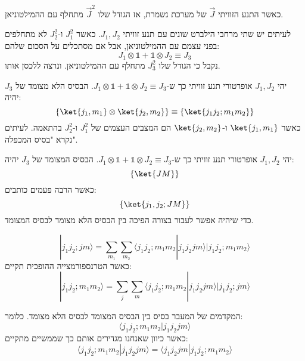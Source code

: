 \documentclass{tstextbook}
\begin{document}
\begin{reminder}
כאשר התנע הזוויתי \(\vec{J}\) של מערכת נשמרת, אז הגודל שלו \(\vec{J}^{2}\) מתחלף עם ההמילטוניאן.

\end{reminder}
\begin{proposition}
לעיתים יש שתי מרחבי הילברט שונים עם תנע זוויתי \(J_{1},J_{2}\). כאשר \(J_{1}^{2}\) ו-\(J_{2}^{2}\) לא מתחלפים בפני עצמם עם ההמילטוניאן, אבל אם מסתכלים על הסכום שלהם:
$$J_{1}\otimes \mathbb{1} +\mathbb{1} \otimes J_{2}\equiv J_{3}$$
נקבל כי הגודל שלו \(J_{3}^{2}\) מתחלף עם ההמילטוניאן. ונרצה ללכסן אותו.

\end{proposition}
\begin{definition}
יהי \(J_{1},J_{2}\) אופרטורי תנע זוויתי כך ש-\(J_{1}\otimes \mathbb{1} +\mathbb{1} \otimes J_{2}\equiv J_{3}\). הבסיס הלא מצומד של \(J_{3}\) יהיה:
$$\left\{  \ket{j_{1},m_{1}} \otimes \ket{j_{2},m_{2}}   \right\}\equiv \left\{  \ket{j_{1}j_{2};m_{1}m_{2}}   \right\}$$
כאשר \(\ket{j_{1},m_{1}}\) ו-\(\ket{j_{2},m_{2}}\) הם המצבים העצמים של \(J_{1}^{2}\) ו-\(J_{2}^{2}\) בהתאמה. לעיתים נקרא "בסיס המכפלה".

\end{definition}
\begin{definition}
יהי \(J_{1},J_{2}\) אופרטורי תנע זוויתי כך ש-\(J_{1}\otimes \mathbb{1} +\mathbb{1} \otimes J_{2}\equiv J_{3}\). הבסיס המצומד של \(J_{3}\) יהיה:
$$\left\{  \ket{JM}   \right\}$$
כאשר הרבה פעמים כותבים:
$$\left\{  \ket{j_{1},j_{2};JM}   \right\}$$
כדי שיהיה אפשר לעבור בצורה הפיכה בין הבסיס הלא מצומד לבסיס המצומד.

\end{definition}
\begin{proposition}
$$|j_{1}j_{2};j m\rangle=\sum_{m_{1}}\sum_{m_{2}}\langle j_{1}j_{2};m_{1}m_{2}|j_{1}j_{2}j m\rangle|j_{1}j_{2};m_{1}m_{2}\rangle$$
כאשר הטרנספורמצייה ההופכית תקיים:
$$|j_{1}j_{2};m_{1}m_{2}\rangle=\sum_{j}\sum_{m}\langle j_{1}j_{2};m_{1}m_{2}|j_{1}j_{2}j m\rangle|j_{1}j_{2};j m\rangle$$

\end{proposition}
\begin{definition}
המקדמים של המעבר בסיס בין הבסיס המצומד לבסיס הלא מצומד. כלומר:
$$\langle j_{1}j_{2};m_{1}m_{2}|j_{1}j_{2}j m\rangle$$
כאשר כיוון שאנחנו מגדירים אותם כך שממשיים מתקיים:
$$\langle j_{1}j_{2};m_{1}m_{2}|j_{1}j_{2}j m\rangle=\langle j_{1}j_{2}j m|j_{1}j_{2};m_{1}m_{2}\rangle$$

\end{definition}
\end{document}

